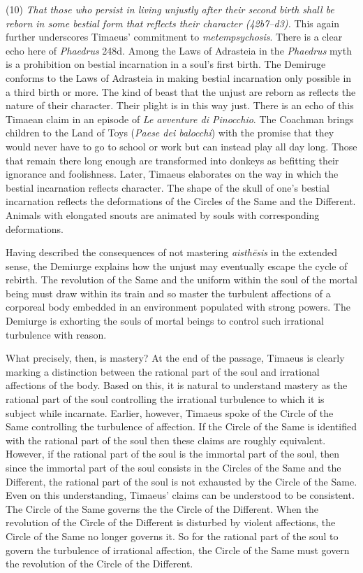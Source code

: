 (10) \emph{That those who persist in living unjustly after their second birth shall be reborn in some bestial form that reflects their character (42b7--d3).} This again further underscores Timaeus' commitment to \emph{metempsychosis}. There is a clear echo here of \emph{Phaedrus} 248d. Among the Laws of Adrasteia in the \emph{Phaedrus} myth is a prohibition on bestial incarnation in a soul's first birth. The Demiruge conforms to the Laws of Adrasteia in making bestial incarnation only possible in a third birth or more. The kind of beast that the unjust are reborn as reflects the nature of their character. Their plight is in this way just. There is an echo of this Timaean claim in an episode of \emph{Le avventure di Pinocchio}. The Coachman brings children to the Land of Toys (\emph{Paese dei balocchi}) with the promise that they would never have to go to school or work but can instead play all day long. Those that remain there long enough are transformed into donkeys as befitting their ignorance and foolishness. Later, Timaeus elaborates on the way in which the bestial incarnation reflects character. The shape of the skull of one's bestial incarnation reflects the deformations of the Circles of the Same and the Different. Animals with elongated snouts are animated by souls with corresponding deformations. 

Having described the consequences of not mastering \emph{aisthēsis} in the extended sense, the Demiurge explains how the unjust may eventually escape the cycle of rebirth. The revolution of the Same and the uniform within the soul of the mortal being must draw within its train and so master the turbulent affections of a corporeal body embedded in an environment populated with strong powers. The Demiurge is exhorting the souls of mortal beings to control such irrational turbulence with reason. 

What precisely, then, is mastery? At the end of the passage, Timaeus is clearly marking a distinction between the rational part of the soul and irrational affections of the body. Based on this, it is natural to understand mastery as the rational part of the soul controlling the irrational turbulence to which it is subject while incarnate. Earlier, however, Timaeus spoke of the Circle of the Same controlling the turbulence of affection. If the Circle of the Same is identified with the rational part of the soul then these claims are roughly equivalent. However, if the rational part of the soul is the immortal part of the soul, then since the immortal part of the soul consists in the Circles of the Same and the Different, the rational part of the soul is not exhausted by the Circle of the Same. Even on this understanding, Timaeus' claims can be understood to be consistent. The Circle of the Same governs the the Circle of the Different. When the revolution of the Circle of the Different is disturbed by violent affections, the Circle of the Same no longer governs it. So for the rational part of the soul to govern the turbulence of irrational affection, the Circle of the Same must govern the revolution of the Circle of the Different.

